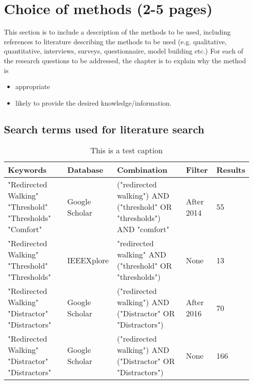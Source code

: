 \chapter{Choice of methods (2-5 pages)}
This section is to include a description of the methods to be used,
including references to literature describing the methods to be used
(e.g. qualitative, quantitative, interviews, surveys,
questionnaire,  model building etc.)
For each of the research questions to be addressed,
the chapter is to explain why the method is
\begin{itemize}
\item appropriate
\item likely to provide the desired knowledge/information.
\end{itemize}

\section{Search terms used for literature search}
\begin{table}[h!]
\centering
\begin{tabularx}{\textwidth}{|X|m{1.7cm}|X|m{1.5cm}|m{1.20cm}|} 
\hline
Keywords & Database & Combination & Filter & Results\\ 
\hline
"Redirected Walking"\newline
"Threshold"\newline
"Thresholds"\newline
"Comfort"& Google Scholar & ("redirected walking") AND ("threshold" OR "thresholds") AND "comfort" & After 2014 & 55\\ 
\hline
"Redirected Walking"\newline
"Threshold"\newline
"Thresholds" & IEEEXplore & "redirected walking" AND ("threshold" OR "thresholds") & None & 13\\ 
\hline
"Redirected Walking"\newline
"Distractor"\newline
"Distractors" & Google Scholar & ("redirected walking") AND ("Distractor" OR "Distractors") & After 2016 & 70\\
\hline
"Redirected Walking"\newline
"Distractor"\newline
"Distractors" & Google Scholar & ("redirected walking") AND ("Distractor" OR "Distractors") & None & 166\\
\hline
\end{tabularx}
\caption{This is a test caption}
\label{table:literaturekeywords}
\end{table}
    
